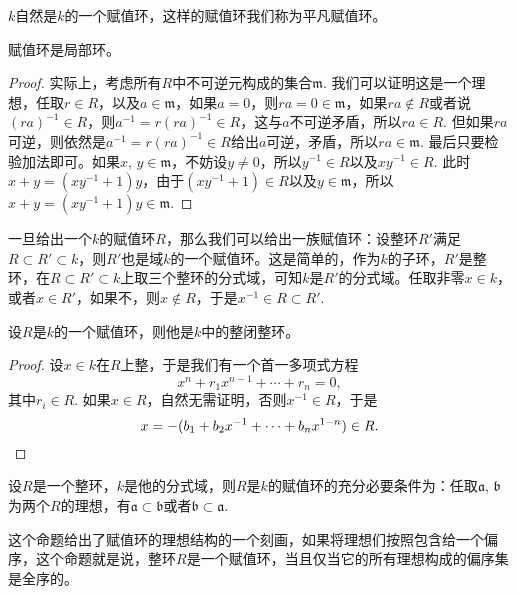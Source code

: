 $k$自然是$k$的一个赋值环，这样的赋值环我们称为平凡赋值环。

\begin{pro}
	赋值环是局部环。	
\end{pro}

\begin{proof} 
	实际上，考虑所有$R$中不可逆元构成的集合$\mathfrak{m}$. 我们可以证明这是一个理想，任取$r\in R$，以及$a\in\mathfrak{m}$，如果$a=0$，则$ra=0\in \mathfrak{m}$，如果$ra\not\in R$或者说$(ra)^{-1}\in R$，则$a^{-1}=r(ra)^{-1}\in R$，这与$a$不可逆矛盾，所以$ra\in R$. 但如果$ra$可逆，则依然是$a^{-1}=r(ra)^{-1}\in R$给出$a$可逆，矛盾，所以$ra\in \mathfrak{m}$. 最后只要检验加法即可。如果$x$, $y\in\mathfrak{m}$，不妨设$y\neq 0$，所以$y^{-1}\in R$以及$xy^{-1}\in R$. 此时$x+y=(xy^{-1}+1)y$，由于$(xy^{-1}+1)\in R$以及$y\in\mathfrak{m}$，所以$x+y=(xy^{-1}+1)y\in \mathfrak{m}$.
\end{proof}

\begin{para}
	一旦给出一个$k$的赋值环$R$，那么我们可以给出一族赋值环：设整环$R'$满足$R\subset R'\subset k$，则$R'$也是域$k$的一个赋值环。这是简单的，作为$k$的子环，$R'$是整环，在$R\subset R'\subset k$上取三个整环的分式域，可知$k$是$R'$的分式域。任取非零$x\in k$，或者$x\in R'$，如果不，则$x\not\in R$，于是$x^{-1}\in R\subset R'$.
\end{para} 

\begin{pro}
设$R$是$k$的一个赋值环，则他是$k$中的整闭整环。
\end{pro}

\begin{proof}
	设$x\in k$在$R$上整，于是我们有一个首一多项式方程
	\[
		x^n+r_1x^{n-1}+\cdots+r_n=0,
	\]
	其中$r_i\in R$. 如果$x\in R$，自然无需证明，否则$x^{-1}\in R$，于是
	\[
		x=-(b_1+b_2x^{-1}+\cdots+b_n x^{1-n})\in R.\qedhere
	\]
\end{proof}

\begin{pro}
设$R$是一个整环，$k$是他的分式域，则$R$是$k$的赋值环的充分必要条件为：任取$\mathfrak{a}$, $\mathfrak{b}$为两个$R$的理想，有$\mathfrak{a}\subset \mathfrak{b}$或者$\mathfrak{b}\subset \mathfrak{a}$. 
\end{pro}

这个命题给出了赋值环的理想结构的一个刻画，如果将理想们按照包含给一个偏序，这个命题就是说，整环$R$是一个赋值环，当且仅当它的所有理想构成的偏序集是全序的。

